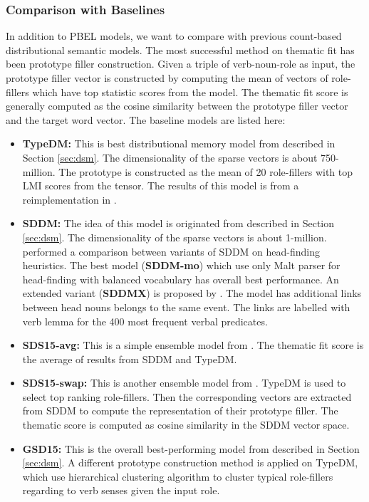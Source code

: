 \documentclass[a4paper]{article}
\begin{document}
\subsubsection{Comparison with Baselines} \label{sec:result-thematic}
In addition to PBEL models, we want to compare with previous count-based distributional semantic models. The most successful method on thematic fit has been prototype filler construction. Given a triple of verb-noun-role as input, the prototype filler vector is constructed by computing the mean of vectors of role-fillers which have top statistic scores from the model. The thematic fit score is generally computed as the cosine similarity between the prototype filler vector and the target word vector. The baseline models are listed here: 
\begin{itemize}
  \item \textbf{TypeDM: } This is best distributional memory model from \citet{baroni2010distributional} described in Section \ref{sec:dsm}.  The dimensionality of the sparse vectors is about 750-million. The prototype is constructed as the mean of 20 role-fillers with top LMI scores from the tensor. The results of this model is from a reimplementation in \citet{greenberg2015improving}. 
  \item \textbf{SDDM: } The idea of this model is originated from \citet{sayeed2014combining} described in Section \ref{sec:dsm}. The dimensionality of the sparse vectors is about 1-million. \citet{sayeed2015exploration} performed a comparison between variants of SDDM on head-finding heuristics. The best model (\textbf{SDDM-mo}) which use only Malt parser for head-finding with balanced vocabulary has overall best performance. An extended variant (\textbf{SDDMX}) is proposed by \citet{greenberg2015improving}. The model has additional links between head nouns belongs to the same event. The links are labelled with verb lemma for the 400 most frequent verbal predicates. 
  \item \textbf{SDS15-avg: }  This is a simple ensemble model from \citet{sayeed2015exploration}. The thematic fit score is the average of results from SDDM and TypeDM. 
  \item \textbf{SDS15-swap: } This is another ensemble model from \citet{sayeed2015exploration}. TypeDM is used to select top ranking role-fillers. Then the corresponding vectors are extracted from SDDM to compute the representation of their prototype filler. The thematic score is computed as cosine similarity in the SDDM vector space. 
  \item \textbf{GSD15: }  This is the overall best-performing model from \citet{greenberg2015improving} described in Section \ref{sec:dsm}. A different prototype construction method is applied on TypeDM, which use hierarchical clustering algorithm to cluster typical role-fillers regarding to verb senses given the input role. 

\end{itemize}
\end{document}

